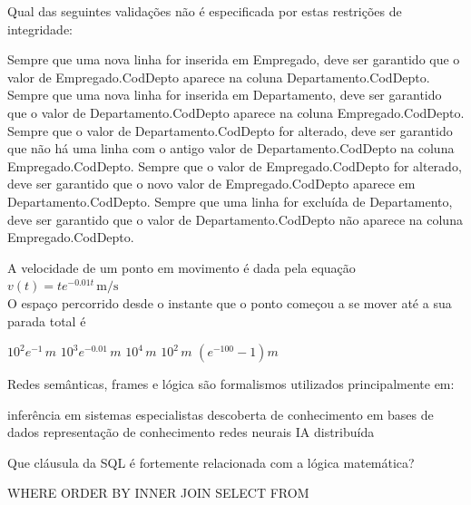 \documentclass[12pt, addpoints]{exam}
\begin{document}
\begin{questions}
Qual das seguintes validações não é especificada por estas restrições de integridade:
\begin{choices}
\choice Sempre que uma nova linha for inserida em Empregado, deve ser garantido que o valor de Empregado.CodDepto aparece na coluna Departamento.CodDepto.
\choice Sempre que uma nova linha for inserida em Departamento, deve ser garantido que o valor de Departamento.CodDepto aparece na coluna Empregado.CodDepto.
\choice Sempre que o valor de Departamento.CodDepto for alterado, deve ser garantido que não há uma linha com o antigo valor de Departamento.CodDepto na coluna Empregado.CodDepto.
\choice Sempre que o valor de Empregado.CodDepto for alterado, deve ser garantido que o novo valor de Empregado.CodDepto aparece em Departamento.CodDepto.
\choice Sempre que uma linha for excluída de Departamento, deve ser garantido que o valor de Departamento.CodDepto não aparece na coluna Empregado.CodDepto.
\end{choices}

\question

A velocidade de um ponto em movimento é dada pela equação\\

$v(t) = t e^{-0.01t} \, \text{m/s}$\\

O espaço percorrido desde o instante que o ponto começou a se mover até a sua parada total é


\begin{choices}
\choice \( 10^2 e^{-1} \, m \)
\choice \( 10^3 e^{-0.01} \, m \)
\choice \( 10^4 \, m \)
\choice \( 10^2 \, m \)
\choice \( (e^{-100} - 1) m \)
\end{choices}

\question

Redes semânticas, frames e lógica são formalismos utilizados principalmente em: 
\begin{choices}
\choice inferência em sistemas especialistas
\choice descoberta de conhecimento em bases de dados
\choice representação de conhecimento
\choice redes neurais
\choice IA distribuída
\end{choices}

\question

Que cláusula da SQL é fortemente relacionada com a lógica matemática?


\begin{choices}
\choice WHERE
\choice ORDER BY
\choice INNER JOIN
\choice SELECT
\choice FROM
\end{choices}


\end{questions}
\end{document}
